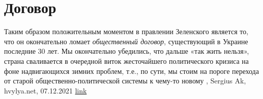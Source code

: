  
 
 
 
 
\chapter{Договор}
\label{sec:slova.dogovor}

Таким образом положительным моментом в правлении Зеленского является то, что он
окончательно ломает \emph{общественный договор}, существующий в Украине последние 30
лет. Мы окончательно убедились, что дальше «так жить нельзя», страна
сваливается в очередной виток жесточайшего политического кризиса на фоне
надвигающихся зимних проблем, т.е., по сути, мы стоим на пороге перехода от
старой общественно-политической системы к чему-то новому
, 
Sergius Ak, hvylya.net, 07.12.2021
\href{https://hvylya.net/analytics/243091-ukraina-posle-zelenskogo}{link}
